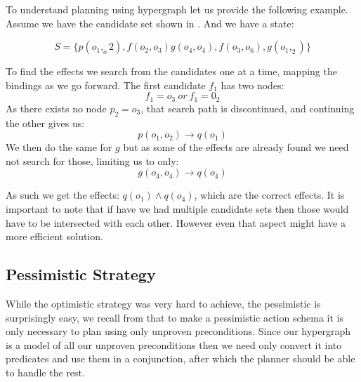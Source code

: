 \documentclass[\master/Master.tex]{subfiles}
\begin{document}
\begin{example} To understand planning using hypergraph let us provide the following example.
	Assume we have the candidate set shown in . And we have a state:
	
	\begin{equation*}
		S = \{ p(o_1,_o2), f(o_2,o_3) g(o_4,o_4), f(o_3,o_6), g(o_1,_2) \}
	\end{equation*}
	
	To find the effects we search from the candidates one at a time, mapping the bindings as we go forward.
	The first candidate $f_1$ has two nodes:
	\begin{equation*}
		f_1 = o_3 ~ or ~ f_1 = 0_2
	\end{equation*}
	 As there exists no node $p_2 = o_3$, that search path is discontinued, and continuing the other gives us:
	 \begin{equation*}
		 p(o_1,o_2) \rightarrow q(o_1)
	 \end{equation*}
	 We then do the same for $g$ but as some of the effects are already found we need not search for those, limiting us to only:
	 \begin{equation*}
		 g(o_4,o_4) \rightarrow q(o_4)
	 \end{equation*}
	 
	 As such we get the effects: $q(o_1)\land q(o_4)$, which are the correct effects.
	 It is important to note that if have we had multiple candidate sets then those would have to be intersected with each other. 
	 However even that aspect might have a more efficient solution.
	
\end{example}

\subsection{Pessimistic Strategy}

While the optimistic strategy was very hard to achieve, the pessimistic is surprisingly easy, we recall from  that to make a pessimistic action schema it is only necessary to plan using only unproven preconditions. Since our hypergraph is a model of all our unproven preconditions then we need only convert it into predicates and use them in a conjunction, after which the planner should be able to handle the rest.
\end{document}
